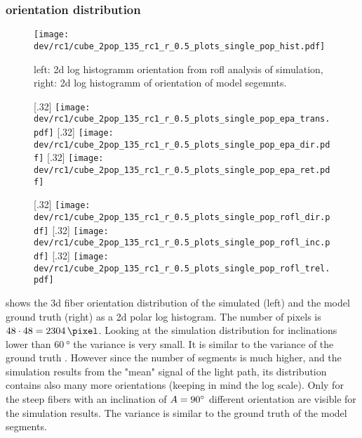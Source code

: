 \subsubsection{orientation distribution}
% 
\begin{figure}[!tp]
\centering
\texttt{[image: dev/rc1/cube\_2pop\_135\_rc1\_r\_0.5\_plots\_single\_pop\_hist.pdf]} 
\caption[sim]{left: 2d log histogramm orientation from rofl analysis of simulation, right: 2d log histogramm of orientation of model segemnts. }
\label{fig:single_fiber_pop_hist}
\end{figure}
% 
% 
% 
\begin{figure}[!tp]
\centering
{}[.32\textwidth]{
\texttt{[image: dev/rc1/cube\_2pop\_135\_rc1\_r\_0.5\_plots\_single\_pop\_epa\_trans.pdf]}}\hfill
{}[.32\textwidth]{
\texttt{[image: dev/rc1/cube\_2pop\_135\_rc1\_r\_0.5\_plots\_single\_pop\_epa\_dir.pdf]}}\hfill
{}[.32\textwidth]{
\texttt{[image: dev/rc1/cube\_2pop\_135\_rc1\_r\_0.5\_plots\_single\_pop\_epa\_ret.pdf]}}
\caption[]{}
\label{fig:single_fiber_pop_epa}
\end{figure}
% 
\begin{figure}[!tp]
\centering
{}[.32\textwidth]{
\texttt{[image: dev/rc1/cube\_2pop\_135\_rc1\_r\_0.5\_plots\_single\_pop\_rofl\_dir.pdf]}}\hfill
{}[.32\textwidth]{
\texttt{[image: dev/rc1/cube\_2pop\_135\_rc1\_r\_0.5\_plots\_single\_pop\_rofl\_inc.pdf]}}\hfill
{}[.32\textwidth]{
\texttt{[image: dev/rc1/cube\_2pop\_135\_rc1\_r\_0.5\_plots\_single\_pop\_rofl\_trel.pdf]}}
\caption[]{}
\label{fig:single_fiber_pop_rofl}
\end{figure}
% 
 shows the 3d fiber orientation distribution of the simulated (left) and the model ground truth (right) as a 2d polar log histogram.
The number of pixels is $48\cdot48=\SI{2304}{\pixel}$.
Looking at the simulation distribution for inclinations lower than $\SI{60}{\degree}$ the variance is very small.
It is similar to the variance of the ground truth .
However since the number of segments is much higher, and the simulation results from the "mean" signal of the light path, its distribution contains also many more orientations (keeping in mind the log scale).
Only for the steep fibers with an inclination of $\textnormal{$A$}{}=\SI{90}{\degree}$ different orientation are visible for the simulation results.
The variance is similar to the ground truth of the model segments.
% 
% 

